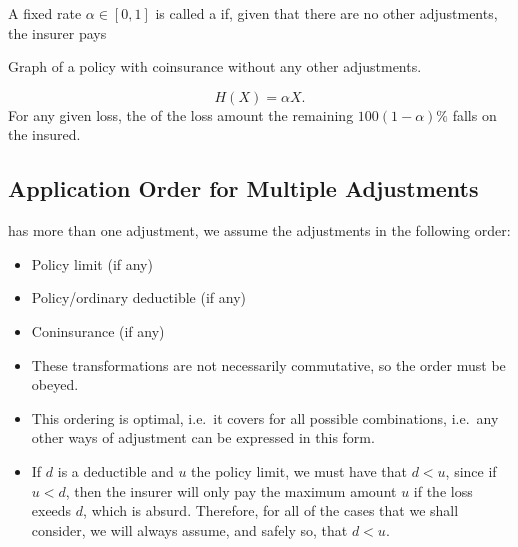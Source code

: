 \documentclass[notoc,notitlepage]{tufte-book}
\begin{document}
\begin{defn}[Coinsurance]\label{defn:coinsurance}
  A fixed rate $\alpha \in [0, 1]$ is called a  if, given that there are no other adjustments, the insurer pays
  \begin{marginfigure}
    \caption{Graph of a policy with coinsurance without any other adjustments.}\label{fig:graph_of_a_policy_with_coinsurance_without_any_other_adjustments}
  \end{marginfigure}
  \begin{equation*}
    H(X) = \alpha X.
  \end{equation*}
  For any given loss, the  of the loss amount the remaining $100(1 - \alpha)\%$ falls on the insured.
\end{defn}

\subsection{Application Order for Multiple Adjustments}%
\label{sub:application_order_for_multiple_adjustments}

 has more than one adjustment, we assume the adjustments in the following order:
\begin{itemize}
  \item Policy limit (if any)
  \item Policy/ordinary deductible (if any)
  \item Coninsurance (if any)
\end{itemize}

\begin{note}
  \begin{itemize}
    \item These transformations are not necessarily commutative, so the order must be obeyed.
    \item This ordering is optimal, i.e.\ it covers for all possible combinations, i.e.\ any other ways of adjustment can be expressed in this form.
    \item If $d$ is a deductible and $u$ the policy limit, we must have that $d < u$, since if $u < d$, then the insurer will only pay the maximum amount $u$ if the loss exeeds $d$, which is absurd. Therefore, for all of the cases that we shall consider, we will always assume, and safely so, that $d < u$.
  \end{itemize}
\end{note}
\end{document}
